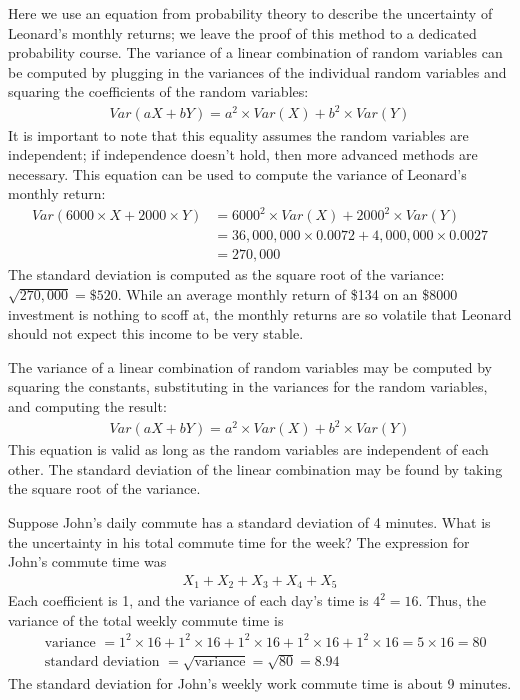 Here we use an equation from probability theory to describe the uncertainty of Leonard's monthly returns; we leave the proof of this method to a dedicated probability course. The variance of a linear combination of random variables can be computed by plugging in the variances of the individual random variables and squaring the coefficients of the random variables:
\begin{align*}
Var(aX + bY) = a^2\times Var(X) + b^2\times Var(Y)
\end{align*}
It is important to note that this equality assumes the random variables are independent; if independence doesn't hold, then more advanced methods are necessary. This equation can be used to compute the variance of Leonard's monthly return:
\begin{align*}
Var(6000\times X + 2000\times Y)
	&= 6000^2\times Var(X) + 2000^2\times Var(Y) \\
	&= 36,000,000\times 0.0072 + 4,000,000\times 0.0027 \\
	&= 270,000
\end{align*}
The standard deviation is computed as the square root of the variance: $\sqrt{270,000} = \$520$. While an average monthly return of \$134 on an \$8000 investment is nothing to scoff at, the monthly returns are so volatile that Leonard should not expect this income to be very stable.

\begin{termBox}{
The variance of a linear combination of random variables may be computed by squaring the constants, substituting in the variances for the random variables, and computing the result:
\begin{align*}
Var(aX + bY) = a^2\times Var(X) + b^2\times Var(Y)
\end{align*}
This equation is valid as long as the random variables are independent of each other. The standard deviation of the linear combination may be found by taking the square root of the variance.}
\end{termBox}

\begin{example}{Suppose John's daily commute has a standard deviation of 4 minutes. What is the uncertainty in his total commute time for the week?} \label{sdOfJohnsCommuteWeeklyTime}
The expression for John's commute time was
\begin{align*}
X_1 + X_2 + X_3 + X_4 + X_5
\end{align*}
Each coefficient is 1, and the variance of each day's time is $4^2=16$. Thus, the variance of the total weekly commute time is
\begin{align*}
&\text{variance }= 1^2 \times  16 + 1^2 \times  16 + 1^2 \times  16 + 1^2 \times  16 + 1^2 \times  16 = 5\times 16 = 80 \\
&\text{standard deviation } = \sqrt{\text{variance}} = \sqrt{80} = 8.94
\end{align*}
The standard deviation for John's weekly work commute time is about 9 minutes.
\end{example}

